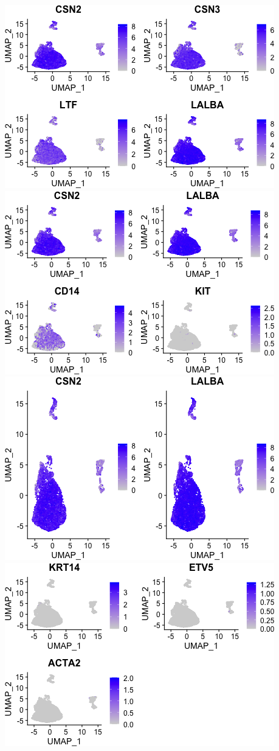 \documentclass[]{article}
\begin{document}
\includegraphics{figures/feature-analysis-4.png}
\includegraphics{figures/feature-analysis-5.png}
\includegraphics{figures/feature-analysis-6.png}
\includegraphics{figures/feature-analysis-7.png}
\end{document}
